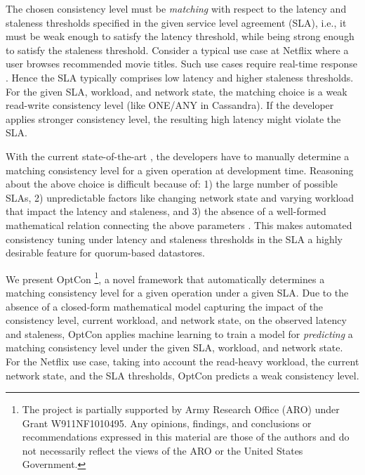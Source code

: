 \documentclass[conference]{IEEEtran}
\begin{document}
The chosen consistency level must be \emph{matching} with respect to the latency and staleness thresholds specified in the
 given service level agreement (SLA), i.e., it must be weak enough to satisfy the latency threshold, while being strong enough to satisfy the staleness threshold.
Consider a typical use case at Netflix \cite{NetflixBlog} where a user browses recommended movie titles. Such use cases require real-time response \cite{NetflixReal-time}. Hence the SLA
      typically comprises low latency and higher staleness thresholds. For the given SLA, workload, and
      network state, the matching choice is a weak read-write consistency level (like ONE/ANY in Cassandra). If the developer applies stronger consistency level, the resulting high latency might violate the SLA.
\par With the current
 state-of-the-art \cite{Terry:2013:CSL:2517349.2522731}, the developers have to manually determine a matching consistency level for a given
 operation at development time. Reasoning about the above choice  is difficult
 because of: 1) the large number of possible SLAs, 2) unpredictable factors like changing network state and
 varying workload that impact the latency and staleness, and 3) the absence of a well-formed mathematical relation connecting the above parameters
  \cite{Bailis:2012:PBS:2212351.2212359}. This
 makes automated consistency tuning under latency and staleness thresholds in the SLA a highly desirable feature for quorum-based datastores.  \par We present OptCon \footnote{The project is partially supported by Army Research Office (ARO) under Grant W911\-NF1010495.  Any opinions, findings, and conclusions or recommendations expressed in this material are those of the authors and do not necessarily reflect
the views of the ARO or the United States Government.}, a novel framework that automatically determines
      a matching consistency level for a given operation under a given SLA. Due to the absence of a closed-form
      mathematical model capturing the impact of the consistency level, current workload, and network state, on the observed latency and staleness, OptCon applies machine learning \cite{Flach:2012:MLA:2490546} to train a model for \emph{predicting} a
      matching consistency level under the given SLA, workload, and network state. For the Netflix use case, taking into account the read-heavy workload, the current network state,
and the SLA thresholds, OptCon predicts a weak consistency level.
%
\end{document}
